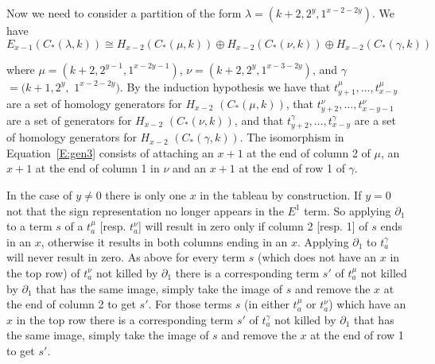 \documentclass{elsart}
\begin{document}
\begin{pf}
  Now we need to consider a partition of the form $\lambda = (k+2, 2^y, 1^{x-2-2y})$. We have 
  \begin{equation} \label{E:gen3} 
    E_{x-1}(C_*(\lambda,k)) \cong H_{x-2}(C_*(\mu,k)) \oplus H_{x-2}(C_*(\nu,k)) \oplus H_{x-2}(C_*(\gamma,k))
  \end{equation}
 
  where $\mu = (k+2, 2^{y-1}, 1^{x-2y-1})$, $\nu = (k+2, 2^y, 1^{x-3-2y})$, and $\gamma$ $= (k+1, 2^y,$ $1^{x-2-2y})$. By the induction 
  hypothesis we have that $t^{\mu}_{y+1}, \ldots, t^\mu_{x-y}$ are a set of homology generators for $H_{x-2}$ $(C_*(\mu,k))$, that 
  $t^{\nu}_{y+2}, \ldots, t^\nu_{x-y-1}$ are a set of generators for $H_{x-2}$ $(C_*(\nu,k))$, and that $t^\gamma_{y+2}, \ldots, t^{\gamma}_{x-y}$ are
  a set of homology generators for $H_{x-2}$ $(C_*(\gamma,k))$. The isomorphism in
  Equation~\ref{E:gen3} consists of attaching an $x+1$ at the end of column 2 of $\mu$, an $x+1$ at the end of column 1 in $\nu$ and an
  $x+1$ at the end of row 1 of $\gamma$. 

  In the case of $y \ne 0$ there is only one 
  $x$ in the tableau by construction. If $y=0$ not that the sign representation no longer appears in the $E^1$ term.
  So applying $\partial_1$ to a term $s$ of a $t^\mu_a$ [resp. $t^\nu_a$] will result in zero only if 
  column 2 [resp. 1] of $s$ ends in an $x$, otherwise it results in both columns ending in an $x$. Applying $\partial_1$ to $t^\gamma_a$ 
  will never result in zero. As above for every term $s$ (which does not have an $x$ in the top row) of $t^\nu_a$ not killed by 
  $\partial_1$ there is a corresponding term 
  $s'$ of $t^\mu_a$ not killed by $\partial_1$ that has the same image, simply take the image of $s$ and remove the $x$ at the end of 
  column 2 to get $s'$. For those terms $s$ (in either $t^\mu_a$ or $t^\nu_a$) which have an $x$ in the top row there is a corresponding
  term $s'$ of $t^\gamma_a$ not killed by $\partial_1$ that
  has the same image, simply take the image of $s$ and remove the $x$ at the end of row 1 to get $s'$. 


\end{pf}
\end{document}
